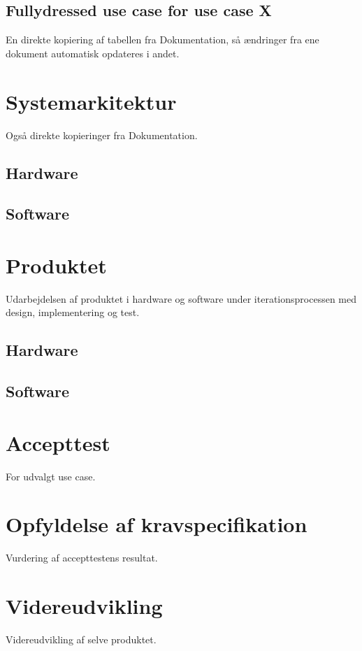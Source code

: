 \subsection{Fullydressed use case for use case X}
En direkte kopiering af tabellen fra Dokumentation, så ændringer fra ene dokument automatisk opdateres i andet.


\section{Systemarkitektur}
Også direkte kopieringer fra Dokumentation.

\subsection{Hardware}

\subsection{Software}


\section{Produktet}

Udarbejdelsen af produktet i hardware og software under iterationsprocessen med design, implementering og test.

\subsection{Hardware}

\subsection{Software}


\section{Accepttest}

For udvalgt use case.


\section{Opfyldelse af kravspecifikation}
Vurdering af accepttestens resultat.


\section{Videreudvikling}
Videreudvikling af selve produktet.
